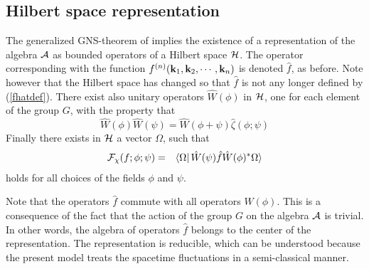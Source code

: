 \documentclass[12pt,a4paper]{article}
\def\kk{{\bf k}}
\begin{document}
\subsection{Hilbert space representation}

The generalized GNS-theorem of \cite {NK01} implies the existence of
a representation of the algebra $\cal A$ as bounded operators of
a Hilbert space $\cal H$. The operator corresponding with the
function $f^{(n)}(\kk_1,\kk_2,\cdots,\kk_n)$ is denoted $\hat f$,
as before. Note however that the Hilbert space has changed so that
$\hat f$ is not any longer defined by (\ref{fhatdef}).
There exist also unitary operators $\hat W(\phi)$ in $\cal H$, one for each element
of the group $G$, with the property that
\begin{equation}
\hat W(\phi)\hat W(\psi)=
\hat W(\phi+\psi)
\hat\zeta(\phi;\psi)
\label{Weylccr2}
\end{equation}
Finally there exists in $\cal H$ a vector
$\Omega$, such that
\begin{eqnarray}
{\cal F}_\chi(f;\phi;\psi)
&=&\langle\Omega|\,\hat W(\psi)\hat f\hat W(\phi)^*\Omega\rangle
\label{repr}
\end{eqnarray}
holds for all choices of the fields $\phi$ and $\psi$.

Note that the operators $\hat f$ commute
with all operators $\hat W(\phi)$. This is a consequence of the fact that
the action of the group $G$ on the algebra $\cal A$ is trivial.
In other words, the algebra of operators
$\hat f$ belongs to the center of the representation.
The representation is reducible, which can be understood because
the present model treats the spacetime fluctuations in a semi-classical
manner.
\end{document}
